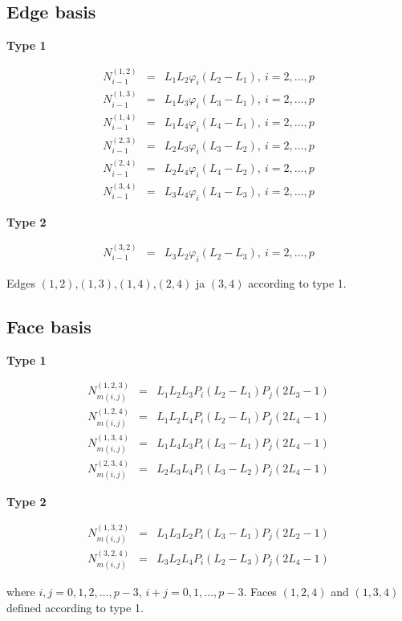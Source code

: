 \subsection{Edge basis}

\noindent \textbf{Type 1}

\begin{eqnarray*}
N_{i-1}^{(1,2)}&=&L_1L_2\varphi_i(L_2-L_1),\ i=2,\ldots,p \\
N_{i-1}^{(1,3)}&=&L_1L_3\varphi_i(L_3-L_1),\ i=2,\ldots,p \\
N_{i-1}^{(1,4)}&=&L_1L_4\varphi_i(L_4-L_1),\ i=2,\ldots,p \\
N_{i-1}^{(2,3)}&=&L_2L_3\varphi_i(L_3-L_2),\ i=2,\ldots,p \\
N_{i-1}^{(2,4)}&=&L_2L_4\varphi_i(L_4-L_2),\ i=2,\ldots,p \\
N_{i-1}^{(3,4)}&=&L_3L_4\varphi_i(L_4-L_3),\ i=2,\ldots,p 
\end{eqnarray*}

\noindent \textbf{Type 2}

\begin{eqnarray*}
N_{i-1}^{(3,2)}&=&L_3L_2\varphi_i(L_2-L_3),\ i=2,\ldots,p
\end{eqnarray*}

\noindent Edges $(1,2)$,$(1,3)$,$(1,4)$,$(2,4)$ ja $(3,4)$ according to type 1.

\subsection{Face basis}

\noindent \textbf{Type 1}

\begin{eqnarray*}
N_{m(i,j)}^{(1,2,3)}&=&L_1L_2L_3P_i(L_2-L_1)P_j(2L_3-1) \\
N_{m(i,j)}^{(1,2,4)}&=&L_1L_2L_4P_i(L_2-L_1)P_j(2L_4-1) \\
N_{m(i,j)}^{(1,3,4)}&=&L_1L_4L_3P_i(L_3-L_1)P_j(2L_4-1) \\
N_{m(i,j)}^{(2,3,4)}&=&L_2L_3L_4P_i(L_3-L_2)P_j(2L_4-1) 
\end{eqnarray*}

\noindent \textbf{Type 2}

\begin{eqnarray*}
N_{m(i,j)}^{(1,3,2)}&=&L_1L_3L_2P_i(L_3-L_1)P_j(2L_2-1) \\
N_{m(i,j)}^{(3,2,4)}&=&L_3L_2L_4P_i(L_2-L_3)P_j(2L_4-1) 
\end{eqnarray*}

\noindent where $i,j=0,1,2,\ldots,p-3$, $i+j=0,1,\ldots,p-3$. Faces $(1,2,4)$ and $(1,3,4)$ defined according to type 1.

